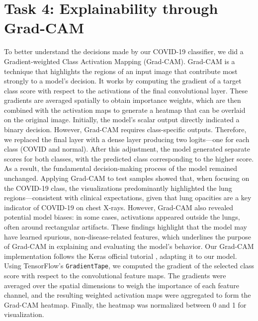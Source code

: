 \documentclass[conference]{IEEEtran}
\begin{document}

\section{Task 4: Explainability through Grad-CAM}\label{sec:task_4}

To better understand the decisions made by our COVID-19 classifier, we did a Gradient-weighted Class Activation Mapping (Grad-CAM). Grad-CAM is a technique that highlights the regions of an input image that contribute most strongly to a model’s decision. It works by computing the gradient of a target class score with respect to the activations of the final convolutional layer. These gradients are averaged spatially to obtain importance weights, which are then combined with the activation maps to generate a heatmap that can be overlaid on the original image.
Initially, the model's scalar output directly indicated a binary decision. However, Grad-CAM requires class-specific outputs. Therefore, we replaced the final layer with a dense layer producing two logits—one for each class (COVID and normal). After this adjustment, the model generated separate scores for both classes, with the predicted class corresponding to the higher score. As a result, the fundamental decision-making process of the model remained unchanged.
Applying Grad-CAM to test samples showed that, when focusing on the COVID-19 class, the visualizations predominantly highlighted the lung regions—consistent with clinical expectations, given that lung opacities are a key indicator of COVID-19 on chest X-rays. However, Grad-CAM also revealed potential model biases: in some cases, activations appeared outside the lungs, often around rectangular artifacts. These findings highlight that the model may have learned spurious, non-disease-related features, which underlines the purpose of Grad-CAM in explaining and evaluating the model's behavior.
Our Grad-CAM implementation follows the Keras official tutorial \cite{keras_gradcam}, adapting it to our model. Using TensorFlow’s \texttt{GradientTape}, we computed the gradient of the selected class score with respect to the convolutional feature maps. The gradients were averaged over the spatial dimensions to weigh the importance of each feature channel, and the resulting weighted activation maps were aggregated to form the Grad-CAM heatmap. Finally, the heatmap was normalized between 0 and 1 for visualization.
\end{document}
